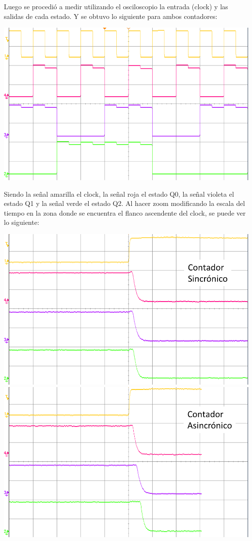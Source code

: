 Luego se procedió a medir utilizando el osciloscopio la entrada (clock) y las salidas de cada estado. Y se obtuvo lo siguiente para ambos contadores:

\begin{center}
\includegraphics{../7-Async-Sync-Counter/contador osc.png}
\end{center}

Siendo la señal amarilla el clock, la señal roja el estado Q0, la señal violeta el estado Q1 y la señal verde el estado Q2.
Al hacer zoom modificando la escala del tiempo en la zona donde se encuentra el flanco ascendente del clock, se puede ver lo siguiente:

\begin{center}
\includegraphics{../7-Async-Sync-Counter/counter_s2.png}
\includegraphics{../7-Async-Sync-Counter/counter_a2.png}
\end{center}

